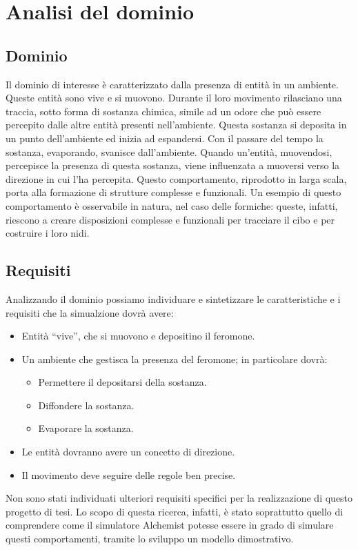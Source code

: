 \chapter{Analisi del dominio}
\section{Dominio}
Il dominio di interesse è caratterizzato dalla presenza di entità in un ambiente.
Queste entità sono vive e si muovono. Durante il loro movimento rilasciano una traccia,
sotto forma di sostanza chimica,
simile ad un odore che può essere percepito dalle altre entità presenti nell'ambiente. Questa sostanza
si deposita in un punto dell'ambiente ed inizia ad espandersi. Con il passare del tempo la sostanza, evaporando, svanisce dall'ambiente.
Quando un'entità, muovendosi, percepisce la presenza di questa sostanza, viene influenzata a muoversi verso la direzione 
in cui l'ha percepita. Questo comportamento, riprodotto in larga scala, porta alla formazione di strutture complesse e funzionali.
Un esempio di questo comportamento è osservabile in natura, nel caso delle formiche: queste, infatti, riescono a 
creare disposizioni complesse e funzionali per tracciare il cibo e per costruire i loro nidi.
\section{Requisiti}
Analizzando il dominio possiamo individuare e sintetizzare
le caratteristiche e i requisiti che la simualzione dovrà avere:
\begin{itemize}
    \item Entità ``vive'', che si muovono e depositino il feromone.
    \item Un ambiente che gestisca la presenza del feromone; in particolare dovrà:
    \begin{itemize}
        \item Permettere il depositarsi della sostanza.
        \item Diffondere la sostanza.
        \item Evaporare la sostanza.
    \end{itemize}
    \item Le entità dovranno avere un concetto di direzione.
    \item Il movimento deve seguire delle regole ben precise.
\end{itemize}

Non sono stati individuati ulteriori requisiti specifici per la realizzazione di questo progetto di tesi.
Lo scopo di questa ricerca, infatti, è stato soprattutto quello di comprendere come il simulatore Alchemist 
potesse essere in grado di simulare questi comportamenti, tramite lo sviluppo un modello
dimostrativo.